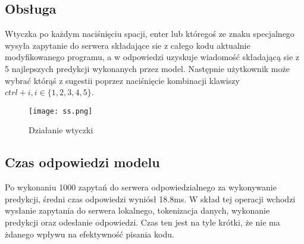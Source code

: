 \subsection{Obsługa}
Wtyczka po każdym naciśnięciu spacji, enter lub któregoś ze znaku specjalnego wysyła zapytanie do serwera składające sie z całego kodu aktualnie 
modyfikowanego programu, a w odpowiedzi uzyskuje wiadomość składającą sie z 5 najlepszych predykcji wykonanych przez model. Następnie użytkownik 
może wybrać którąś z sugestii poprzez naciśnięcie kombinacji klawiszy \begin{math}ctrl + i, i\in \{1,2,3,4,5\}\end{math}.
\begin{figure}[!h]
	\caption{Działanie wtyczki}
    \label{fig:dzialanie_wtyczki}
    \centering \texttt{[image: ss.png]}
\end{figure}
\subsection{Czas odpowiedzi modelu}
Po wykonaniu 1000 zapytań do serwera odpowiedzialnego za wykonywanie predykcji, średni czas odpowiedzi wyniósł 18.8ms. W skład tej operacji 
wchodzi wysłanie zapytania do serwera lokalnego, tokenizacja danych, wykonanie predykcji oraz odesłanie odpowiedzi. Czas ten jest na tyle 
krótki, że nie ma żdanego wpływu na efektywność pisania kodu. 


